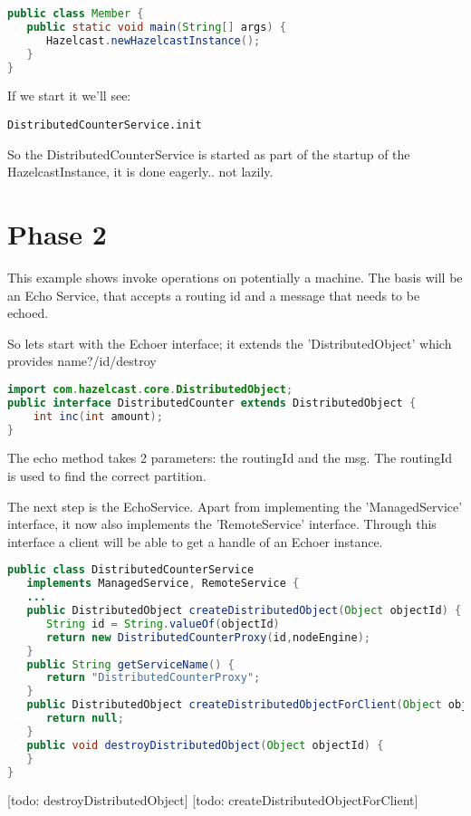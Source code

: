\begin{lstlisting}[language=java]
public class Member {
   public static void main(String[] args) {
      Hazelcast.newHazelcastInstance();
   }
}
\end{lstlisting}
If we start it we'll see:
\begin{lstlisting}
DistributedCounterService.init
\end{lstlisting}
So the DistributedCounterService is started as part of the startup of the HazelcastInstance, it is done eagerly.. not lazily.

\section{Phase 2}
This example shows invoke operations on potentially a machine. The basis will be an Echo Service, that accepts a routing id and a message that needs to be echoed.

So lets start with the Echoer interface; it extends the 'DistributedObject' which provides name?/id/destroy
\begin{lstlisting}[language=java]
import com.hazelcast.core.DistributedObject;
public interface DistributedCounter extends DistributedObject {
    int inc(int amount);
}
\end{lstlisting}
The echo method takes 2 parameters: the routingId and the msg. The routingId is used to find the correct partition. 

The next step is the EchoService. Apart from implementing the 'ManagedService' interface, it now also implements the 'RemoteService' interface. Through this interface a client will be able to get a handle of an Echoer instance.
\begin{lstlisting}[language=java]
public class DistributedCounterService 
   implements ManagedService, RemoteService {
   ...  
   public DistributedObject createDistributedObject(Object objectId) {
      String id = String.valueOf(objectId)
      return new DistributedCounterProxy(id,nodeEngine);
   }
   public String getServiceName() {
      return "DistributedCounterProxy";
   }
   public DistributedObject createDistributedObjectForClient(Object objectId) {
      return null;
   }
   public void destroyDistributedObject(Object objectId) {
   }
}
\end{lstlisting}
[todo: destroyDistributedObject]
[todo: createDistributedObjectForClient]

